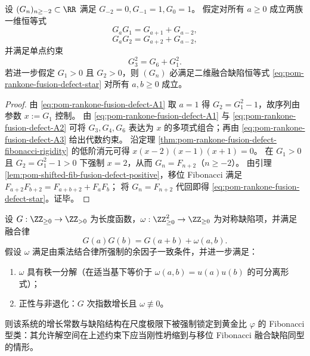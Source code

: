 \begin{theorem}[融合缺陷恒等式的有限检验基]\label{thm:pom-rankone-fusion-defect-finite-basis}
设 \((G_n)_{n\ge -2}\subset\RR\) 满足
\(
G_{-2}=0,G_{-1}=1,G_0=1
\)。
假定对所有 \(a\ge 0\) 成立两族一维恒等式
\begin{equation}\label{eq:pom-rankone-fusion-defect-A1}
G_aG_1=G_{a+1}+G_{a-2},
\end{equation}
\begin{equation}\label{eq:pom-rankone-fusion-defect-A2}
G_aG_2=G_{a+2}+G_{a-2},
\end{equation}
并满足单点约束
\begin{equation}\label{eq:pom-rankone-fusion-defect-A3}
G_3^2=G_6+G_1^2.
\end{equation}
若进一步假定 \(G_1>0\) 且 \(G_2>0\)，则 \((G_n)\) 必满足二维融合缺陷恒等式 \eqref{eq:pom-rankone-fusion-defect-star} 对所有 \(a,b\ge 0\) 成立。
\end{theorem}
\begin{proof}
由 \eqref{eq:pom-rankone-fusion-defect-A1} 取 \(a=1\) 得 \(G_2=G_1^2-1\)，故序列由参数 \(x:=G_1\) 控制。
由 \eqref{eq:pom-rankone-fusion-defect-A1} 与 \eqref{eq:pom-rankone-fusion-defect-A2} 可将 \(G_3,G_4,G_6\) 表达为 \(x\) 的多项式组合；再由 \eqref{eq:pom-rankone-fusion-defect-A3} 给出代数约束。
沿定理 \ref{thm:pom-rankone-fusion-defect-fibonacci-rigidity} 的低阶消元可得
\(
x(x-2)(x-1)(x+1)=0
\)。
在 \(G_1>0\) 且 \(G_2=G_1^2-1>0\) 下强制 \(x=2\)，从而 \(G_n=F_{n+2}\)（\(n\ge -2\)）。
由引理 \ref{lem:pom-shifted-fib-fusion-defect-positive}，移位 Fibonacci 满足
\(
F_{a+2}F_{b+2}=F_{a+b+2}+F_aF_b
\)；
将 \(G_n=F_{n+2}\) 代回即得 \eqref{eq:pom-rankone-fusion-defect-star}。证毕。
\end{proof}

\begin{conjecture}[正秩一融合缺陷的黄金比唯一性]\label{conj:pom-positive-rankone-defect-golden-uniqueness}
设 \(G:\ZZ_{\ge 0}\to\ZZ_{>0}\) 为长度函数，\(\omega:\ZZ_{\ge 0}^2\to\ZZ_{\ge 0}\) 为对称缺陷项，并满足融合律
\[
G(a)G(b)=G(a+b)+\omega(a,b).
\]
假设 \(\omega\) 满足由乘法结合律所强制的余因子一致条件，并进一步满足：
\begin{enumerate}
  \item \(\omega\) 具有秩一分解（在适当基下等价于 \(\omega(a,b)=u(a)u(b)\) 的可分离形式）；
  \item 正性与非退化：\(G\) 次指数增长且 \(\omega\not\equiv 0\)。
\end{enumerate}
则该系统的增长常数与缺陷结构在尺度极限下被强制锁定到黄金比 \(\varphi\) 的 Fibonacci 型类：其允许解空间在上述约束下应当刚性坍缩到与移位 Fibonacci 融合缺陷同型的情形。
\end{conjecture}

